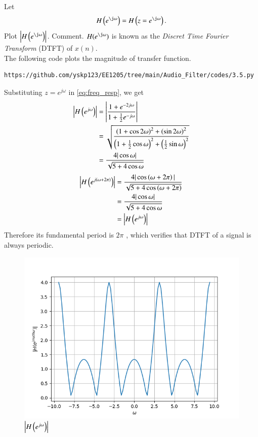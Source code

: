\documentclass[journal,12pt,twocolumn]{IEEEtran}
\theoremstyle{remark}
\begin{document}
\begin{enumerate}[label=\thesection.\arabic*]
Let
\begin{equation}
H\brak{e^{\j \omega}} = H\brak{z = e^{\j \omega}}.
\end{equation}
Plot $\abs{H\brak{e^{\j \omega}}}$.  Comment.  $H(e^{\j \omega})$ is
known as the {\em Discret Time Fourier Transform} (DTFT) of $x(n)$.
\\
\solution The following code plots the magnitude of transfer function.
\begin{lstlisting}
https://github.com/yskp123/EE1205/tree/main/Audio_Filter/codes/3.5.py
\end{lstlisting}
Substituting $z = e^{j \omega}$ in \eqref{eq:freq_resp}, we get
\begin{align}
	\left|H\left(e^{j\omega}\right)\right| &= \left|\frac{1 + e^{-2j\omega}}{1 + \frac{1}{2}e^{-j\omega}}\right| \\
									  &= \sqrt{\frac{\left(1 + \cos{2\omega}\right)^2 + \left(\sin{2\omega}\right)^2}{\left(1 + \frac{1}{2}\cos{\omega}\right)^2 + \left(\frac{1}{2}\sin{\omega}\right)^2}}\\
									  &= \frac{4|\cos{\omega}|}{\sqrt{5 + 4\cos{\omega}}}
\end{align}
\begin{align}
	\left|H\left(e^{j\left(\omega + 2\pi\right)}\right)\right| &= \frac{4|\cos\left(\omega + 2\pi\right)|}{\sqrt{5 + 4\cos\left(\omega + 2\pi\right)}} \\
											   &= \frac{4|\cos{\omega}|}{\sqrt{5 + 4\cos{\omega}}} \\
											   &= \left|H\left(e^{j\omega}\right)\right|	
\end{align}
Therefore its fundamental period is $2\pi$ , which verifies that DTFT of a signal is always periodic.

\begin{figure}[H]
\centering
\includegraphics[width=\columnwidth]{figs/H(z)_3.5.png}
\caption{$\left\vert H\left(e^{j\omega}\right)\right\vert$}
\label{fig:H(z)_3.5}
\end{figure}
\end{enumerate}
\end{document}
